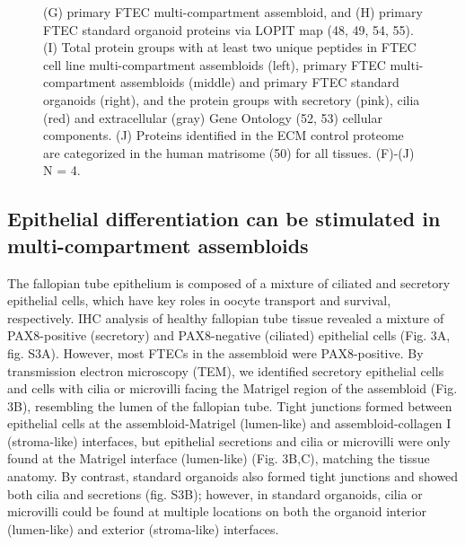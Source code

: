 \begin{refsection}
    \begin{figure}[h!]
        \ContinuedFloat
        \captionsetup{font=small}
        \caption[]{ (G) primary FTEC multi-compartment assembloid, and (H) primary FTEC standard organoid proteins via LOPIT map (48, 49, 54, 55). (I) Total protein groups with at least two unique peptides in FTEC cell line multi-compartment assembloids (left), primary FTEC multi-compartment assembloids (middle) and primary FTEC standard organoids (right), and the protein groups with secretory (pink), cilia (red) and extracellular (gray) Gene Ontology (52, 53) cellular components. (J) Proteins identified in the ECM control proteome are categorized in the human matrisome (50) for all tissues. (F)-(J) N = 4.}
    \end{figure}
    
    \subsection{Epithelial differentiation can be stimulated in multi-compartment assembloids}
    The fallopian tube epithelium is composed of a mixture of ciliated and secretory epithelial cells, which have key roles in oocyte transport and survival, respectively\cite{yuan2021a,suarez2021a,wanggren2008a}. IHC analysis of healthy fallopian tube tissue revealed a mixture of PAX8-positive (secretory) and PAX8-negative (ciliated)\cite{kessler2015a,perets2013a,chaves-moreira2022a,karst2011a,karst2012a} epithelial cells (Fig. 3A, fig. S3A). However, most FTECs in the assembloid were PAX8-positive. By transmission electron microscopy (TEM), we identified secretory epithelial cells and cells with cilia or microvilli facing the Matrigel region of the assembloid (Fig. 3B), resembling the lumen of the fallopian tube\cite{kessler2015a}. Tight junctions formed between epithelial cells at the assembloid-Matrigel (lumen-like) and assembloid-collagen I (stroma-like) interfaces, but epithelial secretions and cilia or microvilli were only found at the Matrigel interface (lumen-like) (Fig. 3B,C), matching the tissue anatomy. By contrast, standard organoids also formed tight junctions and showed both cilia and secretions (fig. S3B); however, in standard organoids, cilia or microvilli could be found at multiple locations on both the organoid interior (lumen-like) and exterior (stroma-like) interfaces. 

\end{refsection}
